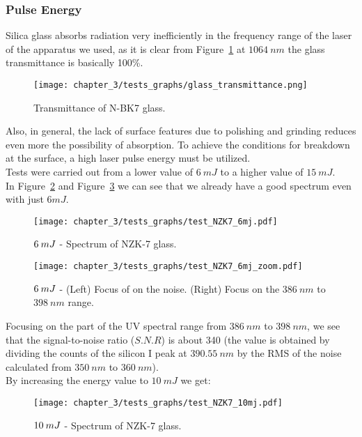 \subsubsection{Pulse Energy}
\label{subsubsec:pulse_energy}
Silica glass absorbs radiation very inefficiently in the frequency range of the laser of the apparatus we used, as it is clear from Figure~\ref{fig:glass_transmittance} at $1064 \: nm$ the glass transmittance is basically 100\%. 
\begin{figure}[H]
    \centering
    \texttt{[image: chapter\_3/tests\_graphs/glass\_transmittance.png]} 
    \caption{Transmittance of N-BK7 glass.}
    \label{fig:glass_transmittance}
 \end{figure}
 Also, in general, the lack of surface features due to polishing and grinding reduces even more the possibility of absorption. To achieve the conditions for breakdown at the surface, a high laser pulse energy must be utilized.
 \\
Tests were carried out from a lower value of $6 \:mJ$ to a higher value of $15\: mJ$.
\\
In Figure~\ref{fig:test_NZK7_6mj} and Figure~\ref{fig:test_NZK7_6mj_zoom} we can see that we already have a good spectrum even with just $6 mJ$.
\begin{figure}[H]
    \centering
    \texttt{[image: chapter\_3/tests\_graphs/test\_NZK7\_6mj.pdf]} 
     \vspace*{-30pt}
    \caption{$\protect 6 \: mJ$ - Spectrum of NZK-7 glass.}
    \label{fig:test_NZK7_6mj}
\end{figure}
\begin{figure}[H]
    \centering
    \texttt{[image: chapter\_3/tests\_graphs/test\_NZK7\_6mj\_zoom.pdf]} 
     \vspace*{-30pt}
    \caption{$\protect 6 \: mJ$ - (Left) Focus of on the noise. (Right) Focus on the $386 \: nm$ to $398 \: nm$ range.}
    \label{fig:test_NZK7_6mj_zoom}
 \end{figure}
Focusing on the part of the UV spectral range from $386 \: nm$ to $398 \: nm$, we see that the signal-to-noise ratio ($S.N.R$) is about 340 (the value is obtained by dividing the counts of the silicon I peak at $390.55 \: nm$ by the RMS of the noise calculated from $350 \: nm$ to $360 \: nm$).
\\
By increasing the energy value to $10 \: mJ$ we get:
\begin{figure}[H]
    \centering
    \texttt{[image: chapter\_3/tests\_graphs/test\_NZK7\_10mj.pdf]} 
     \vspace*{-30pt}
    \caption{$\protect 10 \: mJ$ - Spectrum of NZK-7 glass.}
    \label{fig:test_NZK7_10mj}
\end{figure}
